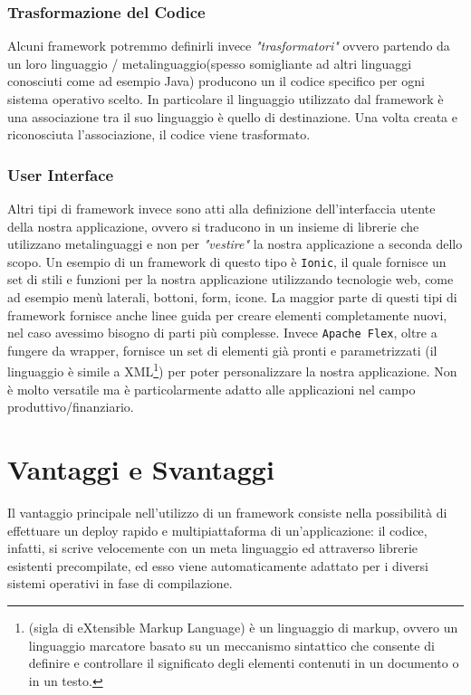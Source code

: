 \subsubsection{Trasformazione del Codice}
Alcuni framework potremmo definirli invece \emph{"trasformatori"} ovvero partendo da un loro linguaggio / metalinguaggio(spesso somigliante ad altri linguaggi conosciuti come ad esempio Java) producono un il codice specifico per ogni sistema operativo scelto.
In particolare il linguaggio utilizzato dal framework è una associazione tra il suo linguaggio è quello di destinazione. Una volta creata e riconosciuta l'associazione, il codice viene trasformato.
\subsubsection{User Interface}
Altri tipi di framework invece sono atti alla definizione dell'interfaccia utente della nostra applicazione, ovvero si traducono in un insieme di librerie che utilizzano metalinguaggi e non per \emph{"vestire"} la nostra applicazione a seconda dello scopo.
Un esempio di un framework di questo tipo è \texttt{Ionic}, il quale fornisce un set di stili e funzioni per la nostra applicazione utilizzando tecnologie web, come ad esempio menù laterali, bottoni, form, icone. La maggior parte di questi tipi di framework fornisce anche linee guida per creare elementi completamente nuovi, nel caso avessimo bisogno di parti più complesse.
Invece \texttt{Apache Flex}, oltre a fungere da wrapper, fornisce un set di elementi già pronti e parametrizzati (il linguaggio è simile a XML\footnote{(sigla di eXtensible Markup Language) è un linguaggio di markup, ovvero un linguaggio marcatore basato su un meccanismo sintattico che consente di definire e controllare il significato degli elementi contenuti in un documento o in un testo.\cite{wiki:xml}}) per poter personalizzare la nostra applicazione. Non è molto versatile ma è particolarmente adatto alle applicazioni nel campo produttivo/finanziario.
\section{Vantaggi e Svantaggi}
Il vantaggio principale nell’utilizzo di un framework consiste nella possibilità di effettuare un deploy rapido e multipiattaforma di un’applicazione: il codice, infatti, si scrive velocemente con un meta linguaggio ed attraverso librerie esistenti precompilate, ed esso viene automaticamente adattato per i diversi sistemi operativi in fase di compilazione.

